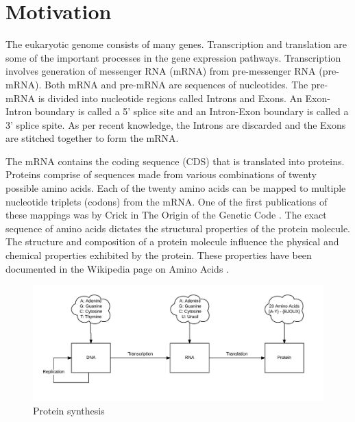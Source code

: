 \documentclass[12pt,a4paper]{article}
\begin{document}
	\tableofcontents
	
	\thispagestyle{empty}
	\newpage
	
	\listoftables
	
	\thispagestyle{empty}
	\newpage
	
	\listoffigures
	
	\thispagestyle{empty}
	\newpage
	
		
	\clearpage
    \doublespacing
	\section{\large Motivation}
    The eukaryotic genome consists of many genes. Transcription and translation are some of the important processes in the gene expression pathways. Transcription involves generation of messenger RNA (mRNA) from pre-messenger RNA (pre-mRNA). Both mRNA and pre-mRNA are sequences of nucleotides. The pre-mRNA is divided into nucleotide regions called Introns and Exons. An Exon-Intron boundary is called a 5’ splice site and an Intron-Exon boundary is called a 3’ splice spite. As per recent knowledge, the Introns are discarded and the Exons are stitched together to form the mRNA. \par
    The mRNA contains the coding sequence (CDS) that is translated into proteins. Proteins comprise of sequences made from various combinations of twenty possible amino acids. Each of the twenty amino acids can be mapped to multiple nucleotide triplets (codons) from the mRNA. One of the first publications of these mappings was by Crick in The Origin of the Genetic Code \cite{crick1}. The exact sequence of amino acids dictates the structural properties of the protein molecule. The structure and composition of a protein molecule influence the physical and chemical properties exhibited by the protein. These properties have been documented in the Wikipedia page on Amino Acids \cite{wiki-aminoacids}. \par
	\begin{figure}[h]
		\includegraphics[width=\textwidth]{synthesis}
		\caption{Protein synthesis}
		\centering
	\end{figure}
\end{document}
